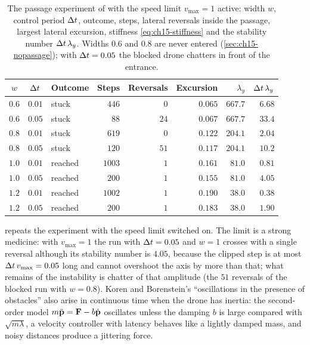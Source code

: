 \begin{table}[tb]
  \centering\small
  \caption{The passage experiment of  with the speed
  limit $v_{\max} = 1$ active: width $w$, control period $\Delta t$, outcome,
  steps, lateral reversals inside the passage, largest lateral excursion,
  stiffness \cref{eq:ch15-stiffness} and the stability number
  $\Delta t\,\lambda_y$. Widths $0.6$ and $0.8$ are never entered
  (\cref{sec:ch15-nopassage}); with $\Delta t = 0.05$ the blocked drone chatters in
  front of the entrance.}
  \label{tab:ch15-corridor}
  \begin{tabular}{@{}ccl rrr rr@{}}
  \toprule
  $w$ & $\Delta t$ & Outcome & Steps & Reversals & Excursion & $\lambda_y$ & $\Delta t\,\lambda_y$\\
  \midrule
  $0.6$ & $0.01$ & stuck   &  $446$ &  $0$ & $0.065$ & $667.7$ & $6.68$\\
  $0.6$ & $0.05$ & stuck   &   $88$ & $24$ & $0.067$ & $667.7$ & $33.4$\\
  $0.8$ & $0.01$ & stuck   &  $619$ &  $0$ & $0.122$ & $204.1$ & $2.04$\\
  $0.8$ & $0.05$ & stuck   &  $120$ & $51$ & $0.117$ & $204.1$ & $10.2$\\
  $1.0$ & $0.01$ & reached & $1003$ &  $1$ & $0.161$ &  $81.0$ & $0.81$\\
  $1.0$ & $0.05$ & reached &  $200$ &  $1$ & $0.155$ &  $81.0$ & $4.05$\\
  $1.2$ & $0.01$ & reached & $1002$ &  $1$ & $0.190$ &  $38.0$ & $0.38$\\
  $1.2$ & $0.05$ & reached &  $200$ &  $1$ & $0.183$ &  $38.0$ & $1.90$\\
  \bottomrule
  \end{tabular}
\end{table}

 repeats the experiment with the speed limit
switched on. The limit is a strong medicine: with $v_{\max} = 1$ the run with
$\Delta t = 0.05$ and $w = 1$ crosses with a single reversal although its
stability number is $4.05$, because the clipped step is at most $\Delta t\,
v_{\max} = 0.05$ long and cannot overshoot the axis by more than that; what
remains of the instability is chatter of that amplitude (the $51$ reversals
of the blocked run with $w = 0.8$). Koren and Borenstein's
``oscillations in the presence of obstacles'' also arise in continuous time
when the drone has inertia: the second-order model $m\ddot{\mathbf{p}} = \mathbf{F}
- b\dot{\mathbf{p}}$ oscillates unless the damping $b$ is large compared with
$\sqrt{m\lambda}$, a velocity controller with latency behaves like a lightly
damped mass, and noisy distances produce a jittering force.

